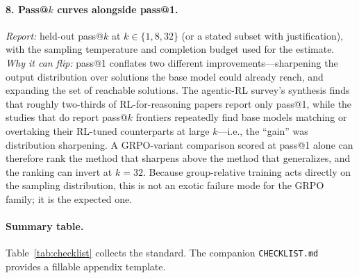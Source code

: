 \documentclass[11pt]{article}
\begin{document}
\paragraph{8. Pass@$k$ curves alongside pass@1.}
\emph{Report:} held-out pass@$k$ at $k \in \{1, 8, 32\}$ (or a stated
subset with justification), with the sampling temperature and completion
budget used for the estimate. \emph{Why it can flip:} pass@1 conflates two
different improvements---sharpening the output distribution over solutions
the base model could already reach, and expanding the set of reachable
solutions. The agentic-RL survey's synthesis \cite{agenticrlsurvey2026}
finds that roughly two-thirds of RL-for-reasoning papers report only
pass@1, while the studies that do report pass@$k$ frontiers repeatedly find
base models matching or overtaking their RL-tuned counterparts at large
$k$---i.e., the ``gain'' was distribution sharpening. A GRPO-variant
comparison scored at pass@1 alone can therefore rank the method that
sharpens above the method that generalizes, and the ranking can invert at
$k=32$. Because group-relative training acts directly on the sampling
distribution, this is not an exotic failure mode for the GRPO family; it is
the expected one.

\paragraph{Summary table.}
Table~\ref{tab:checklist} collects the standard. The companion
\texttt{CHECKLIST.md} provides a fillable appendix template.
\end{document}
